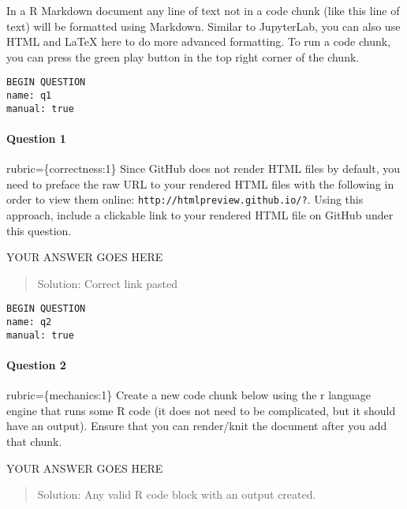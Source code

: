 \documentclass[
]{article}
\begin{document}
In a R Markdown document any line of text not in a code chunk (like this
line of text) will be formatted using Markdown. Similar to JupyterLab,
you can also use HTML and LaTeX here to do more advanced formatting. To
run a code chunk, you can press the green play button in the top right
corner of the chunk.

\begin{verbatim}
BEGIN QUESTION
name: q1
manual: true
\end{verbatim}

\begin{alert alert-info}
\hypertarget{question-1}{%
\paragraph{Question 1}\label{question-1}}

rubric=\{correctness:1\} Since GitHub does not render HTML files by
default, you need to preface the raw URL to your rendered HTML files
with the following in order to view them online:
\texttt{http://htmlpreview.github.io/?}. Using this approach, include a
clickable link to your rendered HTML file on GitHub under this question.
\end{alert alert-info}

YOUR ANSWER GOES HERE

\begin{quote}
Solution: Correct link pasted
\end{quote}

\begin{verbatim}
BEGIN QUESTION
name: q2
manual: true
\end{verbatim}

\begin{alert alert-info}
\hypertarget{question-2}{%
\paragraph{Question 2}\label{question-2}}

rubric=\{mechanics:1\} Create a new code chunk below using the r
language engine that runs some R code (it does not need to be
complicated, but it should have an output). Ensure that you can
render/knit the document after you add that chunk.
\end{alert alert-info}

YOUR ANSWER GOES HERE

\begin{quote}
Solution: Any valid R code block with an output created.
\end{quote}
\end{document}
